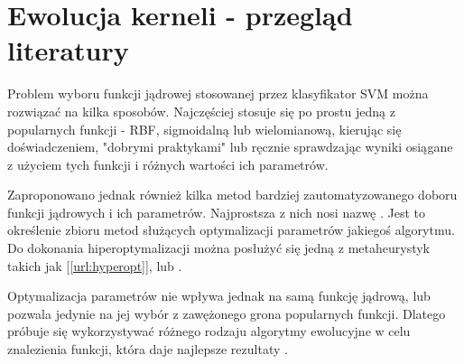\section{Ewolucja kerneli - przegląd literatury}
Problem wyboru funkcji jądrowej stosowanej przez klasyfikator SVM można rozwiązać na kilka sposobów. Najczęściej stosuje się po prostu jedną z popularnych funkcji - RBF, sigmoidalną lub wielomianową, kierując się doświadczeniem, "dobrymi praktykami" lub ręcznie sprawdzając wyniki osiągane z użyciem tych funkcji i różnych wartości ich parametrów.

Zaproponowano jednak również kilka metod bardziej zautomatyzowanego doboru funkcji jądrowych i ich parametrów. 
Najprostsza z nich nosi nazwę . Jest to określenie zbioru metod służących optymalizacji parametrów jakiegoś algorytmu. Do dokonania hiperoptymalizacji można posłużyć się jedną z metaheurystyk takich jak  [\ref{url:hyperopt}], lub  \cite{practical_2003}.

Optymalizacja parametrów nie wpływa jednak na samą funkcję jądrową, lub pozwala jedynie na jej wybór z zawężonego grona popularnych funkcji. Dlatego próbuje się wykorzystywać różnego rodzaju algorytmy ewolucyjne w celu znalezienia funkcji, która daje najlepsze rezultaty \cite{gagne_genetic_2006} \cite{howley_genetic_2005} \cite{sean_ecj_2010} \cite{sullivan_evolving_2007}.

\clearpage